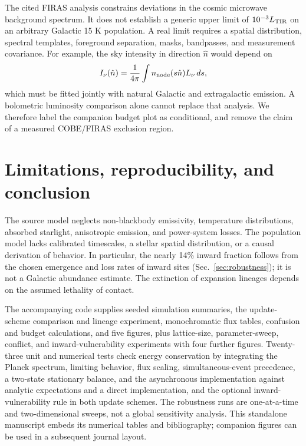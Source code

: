 \documentclass[10pt,twocolumn]{article}
\begin{document}
The cited FIRAS analysis \cite{Fixsen1996} constrains deviations in the
cosmic microwave background spectrum. It does not establish a generic
upper limit of $10^{-3}L_{\rm TIR}$ on an arbitrary Galactic 15 K
population. A real limit requires a spatial distribution, spectral
templates, foreground separation, masks, bandpasses, and measurement
covariance. For example, the sky intensity in direction $\hat n$ would
depend on
\begin{equation}
I_\nu(\hat n)=\frac{1}{4\pi}\int n_{\rm node}(s\hat n)L_\nu\,ds,
\end{equation}
which must be fitted jointly with natural Galactic and extragalactic
emission. A bolometric luminosity comparison alone cannot replace that
analysis. We therefore label the companion budget plot as conditional,
and remove the claim of a measured COBE/FIRAS exclusion region.

\section{Limitations, reproducibility, and conclusion}
The source model neglects non-blackbody emissivity, temperature
distributions, absorbed starlight, anisotropic emission, and power-system
losses. The population model lacks calibrated timescales, a stellar
spatial distribution, or a causal derivation of behavior. In particular,
the nearly 14\% inward fraction follows from the chosen emergence and
loss rates of inward sites (Sec.~\ref{sec:robustness}); it is not a
Galactic abundance estimate. The extinction of expansion lineages
depends on the assumed lethality of contact.

The accompanying code supplies seeded simulation summaries, the
update-scheme comparison and lineage experiment, monochromatic flux
tables, confusion and budget calculations, and five
figures, plus lattice-size, parameter-sweep, conflict, and
inward-vulnerability experiments with four further figures. Twenty-three unit and numerical tests check energy conservation by
integrating the Planck spectrum, limiting behavior, flux scaling,
simultaneous-event precedence, a two-state stationary balance, and the
asynchronous implementation against analytic expectations and a direct
implementation, and the optional inward-vulnerability rule in both
update schemes. The robustness runs are one-at-a-time and
two-dimensional sweeps, not a global sensitivity analysis. This standalone manuscript
embeds its numerical tables and bibliography; companion figures can be
used in a subsequent journal layout.
\end{document}
